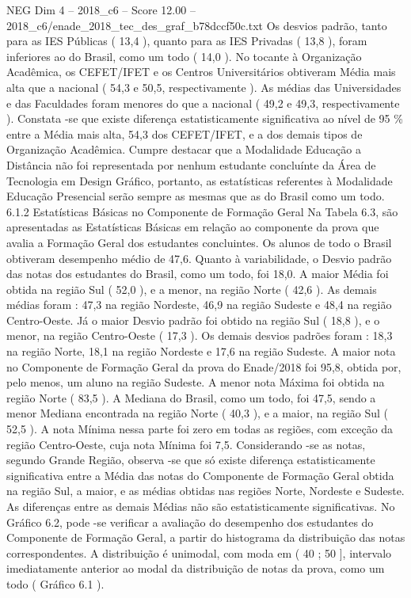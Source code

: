 \begin{textsample}{NEG Dim 4 – 2018\_c6 – Score 12.00 – 2018\_c6/enade\_2018\_tec\_des\_graf\_b78dccf50c.txt}
Os desvios padrão, tanto para as IES Públicas ( 13,4 ), quanto para as IES Privadas ( 13,8 ), foram inferiores ao do Brasil, como um todo ( 14,0 ).
No tocante à Organização Acadêmica, os CEFET/IFET e os Centros Universitários obtiveram Média mais alta que a nacional ( 54,3 e 50,5, respectivamente ).
As médias das Universidades e das Faculdades foram menores do que a nacional ( 49,2 e 49,3, respectivamente ).
Constata -se que existe diferença estatisticamente significativa ao nível de 95 \% entre a Média mais alta, 54,3 dos CEFET/IFET, e a dos demais tipos de Organização Acadêmica.
Cumpre destacar que a Modalidade Educação a Distância não foi representada por nenhum estudante concluínte da Área de Tecnologia em Design Gráfico, portanto, as estatísticas referentes à Modalidade Educação Presencial serão sempre as mesmas que as do Brasil como um todo. 6.1.2 Estatísticas Básicas no Componente de Formação Geral Na Tabela 6.3, são apresentadas as Estatísticas Básicas em relação ao componente da prova que avalia a Formação Geral dos estudantes concluintes.
Os alunos de todo o Brasil obtiveram desempenho médio de 47,6.
Quanto à variabilidade, o Desvio padrão das notas dos estudantes do Brasil, como um todo, foi 18,0.
A maior Média foi obtida na região Sul ( 52,0 ), e a menor, na região Norte ( 42,6 ).
As demais médias foram : 47,3 na região Nordeste, 46,9 na região Sudeste e 48,4 na região Centro-Oeste.
Já o maior Desvio padrão foi obtido na região Sul ( 18,8 ), e o menor, na região Centro-Oeste ( 17,3 ).
Os demais desvios padrões foram : 18,3 na região Norte, 18,1 na região Nordeste e 17,6 na região Sudeste.
A maior nota no Componente de Formação Geral da prova do Enade/2018 foi 95,8, obtida por, pelo menos, um aluno na região Sudeste.
A menor nota Máxima foi obtida na região Norte ( 83,5 ).
A Mediana do Brasil, como um todo, foi 47,5, sendo a menor Mediana encontrada na região Norte ( 40,3 ), e a maior, na região Sul ( 52,5 ).
A nota Mínima nessa parte foi zero em todas as regiões, com exceção da região Centro-Oeste, cuja nota Mínima foi 7,5.
Considerando -se as notas, segundo Grande Região, observa -se que só existe diferença estatisticamente significativa entre a Média das notas do Componente de Formação Geral obtida na região Sul, a maior, e as médias obtidas nas regiões Norte, Nordeste e Sudeste.
As diferenças entre as demais Médias não são estatisticamente significativas.
No Gráfico 6.2, pode -se verificar a avaliação do desempenho dos estudantes do Componente de Formação Geral, a partir do histograma da distribuição das notas correspondentes.
A distribuição é unimodal, com moda em ( 40 ; 50 ], intervalo imediatamente anterior ao modal da distribuição de notas da prova, como um todo ( Gráfico 6.1 ).

\end{textsample}
